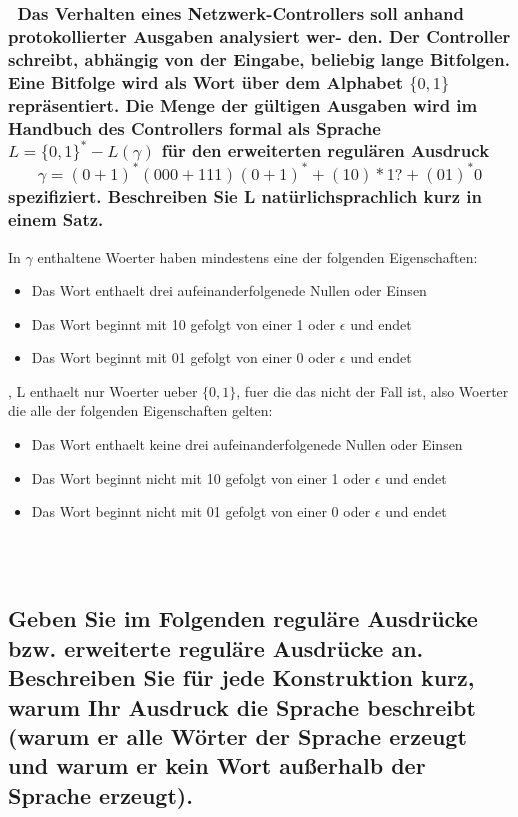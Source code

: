 \documentclass{article}
\newcommand{\gap}{\null\ \\ \\}
\newcommand{\eps}{\epsilon}
\begin{document}
\subsubsection{\
    Das Verhalten eines Netzwerk-Controllers soll anhand protokollierter 
        Ausgaben analysiert wer- den. Der Controller schreibt, abhängig von der 
        Eingabe, beliebig lange Bitfolgen. Eine Bitfolge wird als Wort über dem 
        Alphabet $\{0, 1\}$ repräsentiert. Die Menge der gültigen Ausgaben wird
        im  Handbuch des Controllers formal als Sprache 
        $L = \{0,1\}^* - L(\gamma)$ für den erweiterten regulären Ausdruck\[
            \gamma = (0+1)^* (000 + 111)(0+1)^* + (10)*1? + (01)^*0
            \]
        spezifiziert. Beschreiben Sie L natürlichsprachlich kurz in einem Satz.
    }
In $\gamma$ enthaltene Woerter haben mindestens eine der folgenden
Eigenschaften:\\
\begin{itemize}
    \item Das Wort enthaelt drei aufeinanderfolgenede Nullen oder Einsen
    \item Das Wort beginnt mit 10 gefolgt von einer 1 oder $\eps$ und endet
    \item Das Wort beginnt mit 01 gefolgt von einer 0 oder $\eps$ und endet
\end{itemize}
, L enthaelt nur Woerter ueber $\{0, 1\}$, fuer die das nicht der Fall ist,
    also Woerter die alle der folgenden Eigenschaften gelten:\\
\begin{itemize}
    \item Das Wort enthaelt keine drei aufeinanderfolgenede Nullen oder Einsen
    \item Das Wort beginnt nicht mit 10 gefolgt von einer 1 oder $\eps$ und 
            endet
    \item Das Wort beginnt nicht mit 01 gefolgt von einer 0 oder $\eps$ und 
            endet
\end{itemize}

\gap
\subsection{
    Geben Sie im Folgenden reguläre Ausdrücke bzw. erweiterte reguläre Ausdrücke
        an. Beschreiben Sie für jede Konstruktion kurz, warum Ihr Ausdruck die 
        Sprache beschreibt (warum er alle Wörter der Sprache erzeugt und warum
        er kein Wort außerhalb der Sprache erzeugt).
    }
\end{document}
